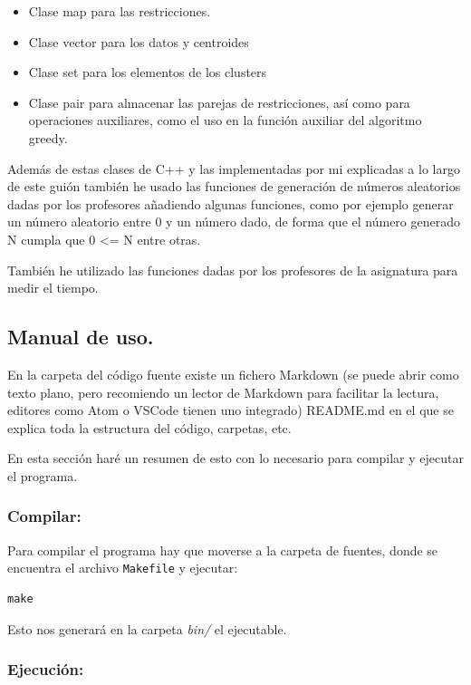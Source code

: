 \documentclass[12pt, spanish]{article}
\begin{document}
\begin{itemize}
	\item Clase map para las restricciones.
	\item Clase vector para los datos y centroides
	\item Clase set para los elementos de los clusters
	\item Clase pair para almacenar las parejas de restricciones, así como para operaciones auxiliares, como el uso en la función auxiliar del algoritmo greedy.
\end{itemize}

Además de estas clases de C++ y las implementadas por mi explicadas a lo largo de este guión también he usado las funciones de generación de números aleatorios dadas por los profesores añadiendo algunas funciones, como por ejemplo generar un número aleatorio entre 0 y un número dado, de forma que el número generado N cumpla que 0 <= N entre otras.

También he utilizado las funciones dadas por los profesores de la asignatura para medir el tiempo.


\subsection{Manual de uso.}

En la carpeta del código fuente existe un fichero Markdown (se puede abrir como texto plano, pero recomiendo un lector de Markdown para facilitar la lectura, editores como Atom o VSCode tienen uno integrado) README.md en el que se explica toda la estructura del código, carpetas, etc.

En esta sección haré un resumen de esto con lo necesario para compilar y ejecutar el programa.

\subsubsection{Compilar:}

Para compilar el programa hay que moverse a la carpeta de fuentes, donde se encuentra el archivo \texttt{Makefile} y ejecutar:

\begin{lstlisting}
make
\end{lstlisting}

Esto nos generará en la carpeta \textit{bin/} el ejecutable.


\subsubsection{Ejecución:}
\end{document}

